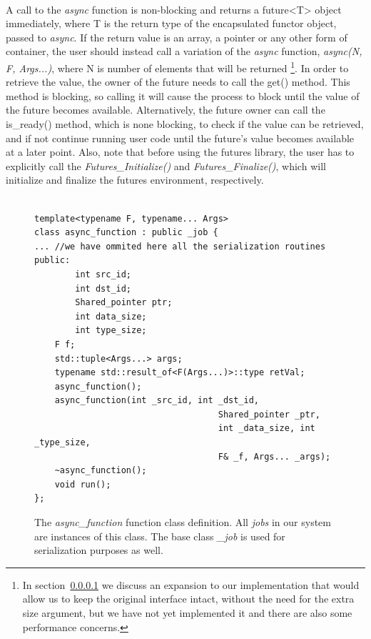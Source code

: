 \paragraph{}
A call to the \emph{async} function is non-blocking and returns a future<T> object immediately, 
where T is the return type of the encapsulated functor object, passed to \emph{async}.
 If the return value is an array, a pointer or any other form of container, the user
should instead call a variation of the \emph{async} function, \emph{async(N, F, Args...)}, 
where N is number of elements that will be returned \footnote{  
In section~\ref{} we discuss an expansion to
our implementation that would allow us to keep the original interface intact, without the need for
the extra size argument, but we have not yet implemented it and there are also some performance concerns.}.
In order to retrieve the value,
the owner of the future needs to call the get() method.  This method is blocking, so calling it will cause the 
process to block until the value of the future becomes available.  Alternatively, the future owner can call the
is\_ready() method, which is none blocking, to check if the value can be retrieved, and if not continue running
user code until the future's value becomes available at a later point.  Also, note that before using
the futures library, the user has to explicitly call the \emph{Futures\_Initialize()} and \emph{Futures\_Finalize()},
which will initialize and finalize the futures environment, respectively. 
    
\begin{figure}[!ht]
\begin{lstlisting}

template<typename F, typename... Args>
class async_function : public _job {
... //we have ommited here all the serialization routines
public:
		int src_id;
		int dst_id;
		Shared_pointer ptr;
		int data_size;
		int type_size;
    F f;
  	std::tuple<Args...> args;
    typename std::result_of<F(Args...)>::type retVal;
    async_function();
    async_function(int _src_id, int _dst_id, 
									Shared_pointer _ptr, 
									int _data_size, int _type_size,
									F& _f, Args... _args);
    ~async_function();
    void run();
};
\end{lstlisting}
\caption{The \emph{async\_function} function class definition.  All \emph{jobs} in our system are
instances of this class.  The base class \emph{\_job} is used for serialization purposes as well.}
\label{lst:async_function}
\end{figure}

